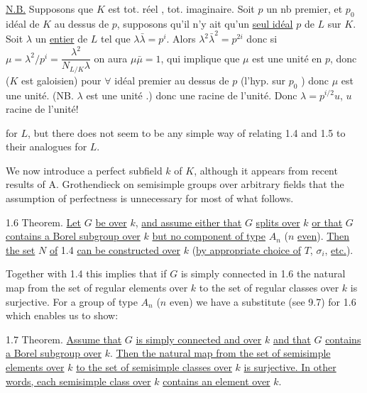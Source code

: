 \uline{N.B.} Supposons que $K$ est tot. réel ,    tot. imaginaire. Soit $p$ un nb premier, et $p_0$ idéal de $K$ au dessus de $p$, supposons qu'il n'y ait qu'un \uline{seul idéal}  $p$  de $L$ sur $K$. Soit $\lambda$ un \uline{entier} de $L$ tel que $\lambda\bar\lambda=p^i$. Alors $\lambda^2\bar\lambda^2=p^{2i}$ donc si $\mu=\lambda^2/p^i=\dfrac{\lambda^2}{N_{L/K}\lambda}$ on aura $\mu\bar\mu=1$,  qui implique que $\mu$ est une unité en $p$, donc ($K$ est galoisien) pour $\forall$ idéal premier au dessus de $p$  (l'hyp. sur $p_0$ ) donc $\mu$ est une unité. (NB. $\lambda$  est une unité .) donc une racine de l'unité. Donc $\lambda=p^{i/2}u$, $u$ racine de l'unité!



for $L$, but there does not seem to be any simple way of relating 1.4 and 1.5 to their analogues for $L$.

We now introduce a perfect subfield $k$ of $K$, although it appears from recent results of A. Grothendieck on semisimple groups over arbitrary fields that the assumption of perfectness is unnecessary for most of what follows.

1.6 Theorem. \uline{Let} $G$ \uline{be over} $k$, \uline{and assume either that} $G$ \uline{splits over} $k$ \uline{or that} $G$ \uline{contains a Borel subgroup over} $k$ \uline{but no component of type} $A_n$ ($n$ \uline{even}). \uline{Then the set} $N$ \uline{of} 1.4 \uline{can be constructed over} $k$ (\uline{by appropriate choice of} $T$, $\sigma_i$, \uline{etc.}).

Together with 1.4 this implies that if $G$ is simply connected in 1.6 the natural map from the set of regular elements over $k$ to the set of regular classes over $k$ is surjective. For a group of type $A_n$ ($n$ even) we have a substitute (see 9.7) for 1.6 which enables us to show:

1.7 Theorem. \uline{Assume that} $G$ \uline{is simply connected and over} $k$ \uline{and that} $G$ \uline{contains a Borel subgroup over} $k$. \uline{Then the natural map from the set of semisimple elements over} $k$ \uline{to the set of semisimple classes over} $k$ \uline{is surjective. In other words, each semisimple class over} $k$ \uline{contains an element over} $k$.

